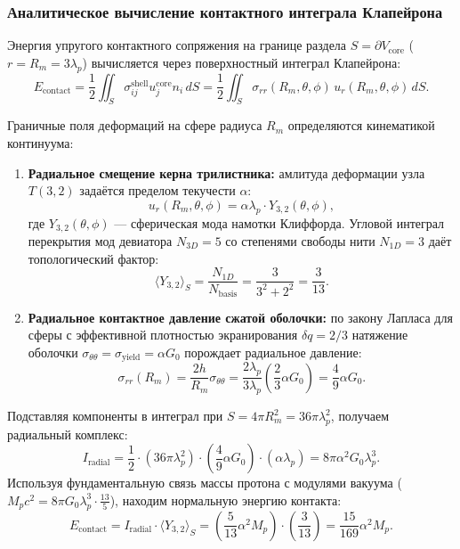 \documentclass[11pt,a4paper]{article}
\theoremstyle{definition}
\theoremstyle{remark}
\begin{document}
\subsubsection{Аналитическое вычисление контактного интеграла Клапейрона}

Энергия упругого контактного сопряжения на границе раздела $S = \partial V_{\mathrm{core}}$ ($r = R_m = 3\lambda_p$) вычисляется через поверхностный интеграл Клапейрона:
\begin{equation}
E_{\mathrm{contact}} = \frac{1}{2} \iint_{S} \sigma_{ij}^{\mathrm{shell}} u_j^{\mathrm{core}} n_i \, dS = \frac{1}{2} \iint_{S} \sigma_{rr}(R_m, \theta, \phi) \, u_r(R_m, \theta, \phi) \, dS.
\end{equation}

Граничные поля деформаций на сфере радиуса $R_m$ определяются кинематикой континуума:
\begin{enumerate}
\item \textbf{Радиальное смещение керна трилистника:} амлитуда деформации узла $T(3,2)$ задаётся пределом текучести $\alpha$:
\begin{equation}
    u_r(R_m, \theta, \phi) = \alpha \lambda_p \cdot Y_{3,2}(\theta, \phi),
\end{equation}
где $Y_{3,2}(\theta, \phi)$ --- сферическая мода намотки Клиффорда. Угловой интеграл перекрытия мод девиатора $N_{3D} = 5$ со степенями свободы нити $N_{1D} = 3$ даёт топологический фактор:
\begin{equation}
    \langle Y_{3,2} \rangle_S = \frac{N_{1D}}{N_{\mathrm{basis}}} = \frac{3}{3^2 + 2^2} = \frac{3}{13}.
\end{equation}
\item \textbf{Радиальное контактное давление сжатой оболочки:} по закону Лапласа для сферы с эффективной плотностью экранирования $\delta q = 2/3$ натяжение оболочки $\sigma_{\theta\theta} = \sigma_{\mathrm{yield}} = \alpha G_0$ порождает радиальное давление:
\begin{equation}
    \sigma_{rr}(R_m) = \frac{2h}{R_m} \sigma_{\theta\theta} = \frac{2\lambda_p}{3\lambda_p} \left(\frac{2}{3} \alpha G_0\right) = \frac{4}{9} \alpha G_0.
\end{equation}
\end{enumerate}

Подставляя компоненты в интеграл при $S = 4\pi R_m^2 = 36\pi \lambda_p^2$, получаем радиальный комплекс:
\begin{equation}
I_{\mathrm{radial}} = \frac{1}{2} \cdot (36\pi \lambda_p^2) \cdot \left(\frac{4}{9} \alpha G_0\right) \cdot (\alpha \lambda_p) = 8\pi \alpha^2 G_0 \lambda_p^3.
\end{equation}
Используя фундаментальную связь массы протона с модулями вакуума ($M_p c^2 = 8\pi G_0 \lambda_p^3 \cdot \frac{13}{5}$), находим нормальную энергию контакта:
\begin{equation}
E_{\mathrm{contact}} = I_{\mathrm{radial}} \cdot \langle Y_{3,2} \rangle_S = \left(\frac{5}{13} \alpha^2 M_p\right) \cdot \left(\frac{3}{13}\right) = \frac{15}{169} \alpha^2 M_p.
\end{equation}
\end{document}
